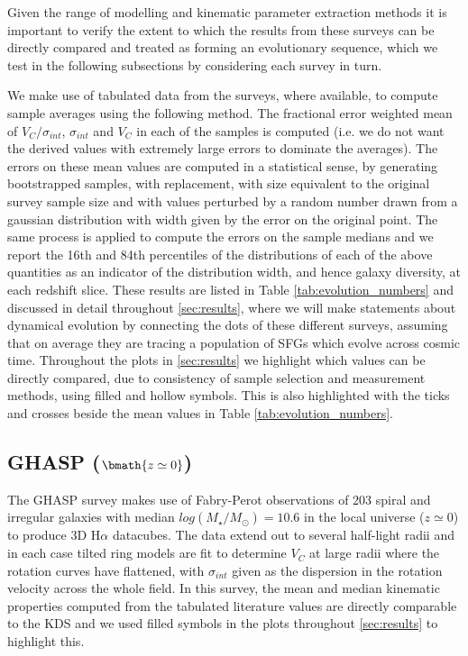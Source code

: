\documentclass[fleqn,usenatbib]{mnras}
\begin{document}
Given the range of modelling and kinematic parameter extraction methods it is important to verify the extent to which the results from these surveys can be directly compared and treated as forming an evolutionary sequence, which we test in the following subsections by considering each survey in turn.

We make use of tabulated data from the surveys, where available, to compute sample averages using the following method. 
The fractional error weighted mean of $V_{C}/\sigma_{int}$, $\sigma_{int}$ and $V_{C}$ in each of the samples is computed (i.e. we do not want the derived values with extremely large errors to dominate the averages).
The errors on these mean values are computed in a statistical sense, by generating bootstrapped samples, with replacement, with size equivalent to the original survey sample size and with values perturbed by a random number drawn from a gaussian distribution with width given by the error on the original point.
The same process is applied to compute the errors on the sample medians and we report the 16th and 84th percentiles of the distributions of each of the above quantities as an indicator of the distribution width, and hence galaxy diversity, at each redshift slice.
These results are listed in Table \ref{tab:evolution_numbers} and discussed in detail throughout \cref{sec:results}, where we will make statements about dynamical evolution by connecting the dots of these different surveys, assuming that on average they are tracing a population of SFGs which evolve across cosmic time.
Throughout the plots in \cref{sec:results} we highlight which values can be directly compared, due to consistency of sample selection and measurement methods, using filled and hollow symbols.
This is also highlighted with the ticks and crosses beside the mean values in Table \ref{tab:evolution_numbers}. 

\subsection{GHASP ($\bmath{z\simeq0}$)}\label{subsec:GHASP}
The GHASP survey \citep[E08]{Epinat2008a,Epinat2008} makes use of Fabry-Perot observations of 203 spiral and irregular galaxies with median $log(M_{\star}/M_{\odot})=10.6$ in the local universe ($z\simeq0$) to produce 3D H$\alpha$ datacubes.
The data extend out to several half-light radii and in each case tilted ring models are fit to determine $V_{C}$ at large radii where the rotation curves have flattened, with $\sigma_{int}$ given as the dispersion in the rotation velocity across the whole field.
In this survey, the mean and median kinematic properties computed from the tabulated literature values are directly comparable to the KDS and we used filled symbols in the plots throughout \cref{sec:results} to highlight this.
\end{document}
